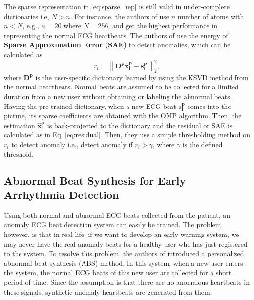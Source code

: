 \documentclass[journal,transmag]{IEEEtran}
\begin{document}
The sparse representation in \eqref{eq:sparse_rep} is still valid in under-complete dictionaries i.e, $N>n$. For instance, the authors of \cite{carrera2016ecg} use $n$ number of atoms with $n<N$, e.g., $n = 20$ where $N = 256$, and get the highest performance in representing the normal ECG heartbeats. The authors of \cite{carrera2016ecg} use the energy of \textbf{Sparse Approximation Error (SAE)} to detect anomalies, which can be calculated as
\begin{equation}
    r_i = \left\| \bm{D^p} {\bm{\hat{x}^p_i}}-\bm{s^p_i} \right\|_2^2, \label{eq:residual}
\end{equation}
where $\bm{D^p}$ is the user-specific dictionary learned by using the KSVD method \cite{KSVD} from the normal heartbeats. Normal beats are assumed to be collected for a limited duration from a new user without obtaining or labeling the abnormal beats. Having the pre-trained dictionary, when a new ECG beat $\bm{s^p_i}$ comes into the picture, its sparse coefficients are obtained with the OMP algorithm. Then, the estimation $\bm{\hat{x}^p_i}$ is back-projected to the dictionary and the residual or SAE is calculated as in Eq. \eqref{eq:residual}. Then, they use a simple thresholding method on $r_i$ to detect anomaly i.e., detect anomaly if $r_i>\gamma$, where $\gamma$ is the defined threshold.   


\subsection{Abnormal Beat Synthesis for Early Arrhythmia Detection}
\label{sec:ABS}
Using both normal and abnormal ECG beats collected from the patient, an anomaly ECG beat detection system can easily be trained. The problem, however, is that in real life, if we want to develop an early warning system, we may never have the real anomaly beats for a healthy user who has just registered to the system. To resolve this problem, the authors of \cite{kiranyaz2017personalized} introduced a personalized abnormal beat synthesis (ABS) method. In this system, when a new user enters the system, the normal ECG beats of this new user are collected for a short period of time. Since the assumption is that there are no anomalous heartbeats in these signals, synthetic anomaly heartbeats are generated from them.
\end{document}
